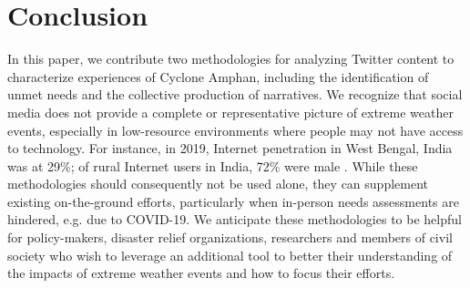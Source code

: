 \documentclass{article}
\begin{document}
\begin{table}
\caption{Sample of tweets from the negative experiences and unmet needs analysis. These result from text summarization over first-person tweets in the `housing' label, which has a negative median sentiment score. We set $K=50$.}
\label{table:unmetneedsexample}
\end{table}

\section{Conclusion}

In this paper, we contribute two methodologies for analyzing Twitter content to characterize
experiences of Cyclone Amphan, including the identification of unmet needs and the collective
production of narratives. We recognize that social media does not provide a complete or
representative picture of extreme weather events, especially in low-resource environments where
people may not have access to technology. For instance, in 2019, Internet penetration in West
Bengal, India was at 29\%; of rural Internet users in India, 72\% were male \cite{conclIAMAI}. While
these methodologies should consequently not be used alone, they can supplement existing
on-the-ground efforts, particularly when in-person needs assessments are hindered, e.g. due to
COVID-19. We anticipate these methodologies to be helpful for policy-makers, disaster relief
organizations, researchers and members of civil society who wish to leverage an additional tool to
better their understanding of the impacts of extreme weather events and how to focus their efforts.
\end{document}
